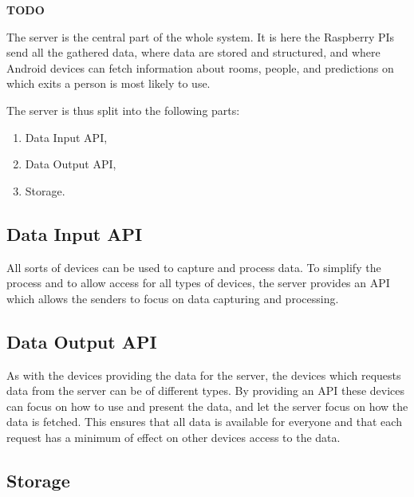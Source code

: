 {\color[rgb]{1,0,0} \textbf{\large TODO}}

The server is the central part of the whole system. It is here the Raspberry PIs send all the gathered data, where data are stored and structured, and where Android devices can fetch information about rooms, people, and predictions on which exits a person is most likely to use.

The server is thus split into the following parts:

\begin{enumerate}
	\item Data Input API,
	\item Data Output API,
	\item Storage.
\end{enumerate}


\subsection{Data Input API}
All sorts of devices can be used to capture and process data. To simplify the process and to allow access for all types of devices, the server provides an API which allows the senders to focus on data capturing and processing.

\subsection{Data Output API}
As with the devices providing the data for the server, the devices which requests data from the server can be of different types. By providing an API these devices can focus on how to use and present the data, and let the server focus on how the data is fetched. This ensures that all data is available for everyone and that each request has a minimum of effect on other devices access to the data.

\subsection{Storage}